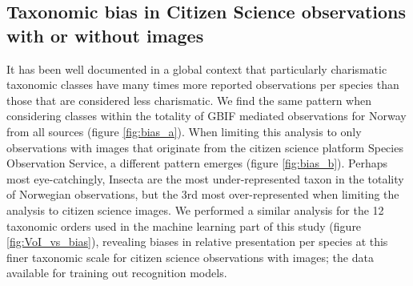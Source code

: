 \documentclass{article}
\begin{document}
\subsection*{Taxonomic bias in Citizen Science observations with or without images}
It has been well documented in a global context that particularly charismatic taxonomic classes have many times more reported observations per species than those that are considered less charismatic\autocite{Troudet2017}. We find the same pattern when considering classes within the totality of GBIF mediated observations for Norway from all sources (figure \ref{fig:bias_a}). When limiting this analysis to only observations with images that originate from the citizen science platform Species Observation Service\autocite{GBIF_dataset}, a different pattern emerges (figure \ref{fig:bias_b}). Perhaps most eye-catchingly, Insecta are the most under-represented taxon in the totality of Norwegian observations, but the 3rd most over-represented when limiting the analysis to citizen science images. We performed a similar analysis for the 12 taxonomic orders used in the machine learning part of this study (figure \ref{fig:VoI_vs_bias}), revealing biases in relative presentation per species at this finer taxonomic scale for citizen science observations with images; the data available for training out recognition models.
\end{document}
